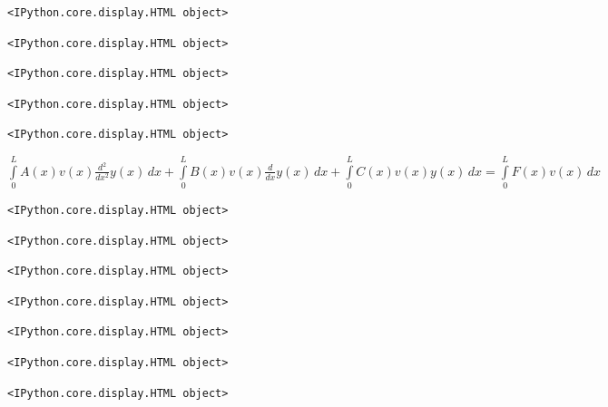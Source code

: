 \documentclass[
  11pt,
  a4paper,
]{scrbook}
\begin{document}
\begin{verbatim}
<IPython.core.display.HTML object>
\end{verbatim}

\begin{verbatim}
<IPython.core.display.HTML object>
\end{verbatim}

\begin{verbatim}
<IPython.core.display.HTML object>
\end{verbatim}

\begin{verbatim}
<IPython.core.display.HTML object>
\end{verbatim}

\begin{verbatim}
<IPython.core.display.HTML object>
\end{verbatim}

$\displaystyle \int\limits_{0}^{L} A{\left(x \right)} v{\left(x \right)} \frac{d^{2}}{d x^{2}} y{\left(x \right)}\, dx + \int\limits_{0}^{L} B{\left(x \right)} v{\left(x \right)} \frac{d}{d x} y{\left(x \right)}\, dx + \int\limits_{0}^{L} C{\left(x \right)} v{\left(x \right)} y{\left(x \right)}\, dx = \int\limits_{0}^{L} F{\left(x \right)} v{\left(x \right)}\, dx$

\begin{verbatim}
<IPython.core.display.HTML object>
\end{verbatim}

\begin{verbatim}
<IPython.core.display.HTML object>
\end{verbatim}

\begin{verbatim}
<IPython.core.display.HTML object>
\end{verbatim}

\begin{verbatim}
<IPython.core.display.HTML object>
\end{verbatim}

\begin{verbatim}
<IPython.core.display.HTML object>
\end{verbatim}

\begin{verbatim}
<IPython.core.display.HTML object>
\end{verbatim}

\begin{verbatim}
<IPython.core.display.HTML object>
\end{verbatim}
\end{document}

